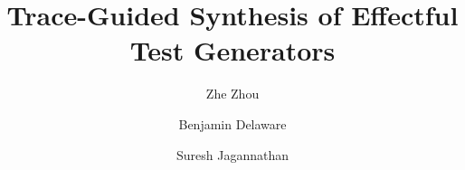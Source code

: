 \documentclass[acmsmall,screen,review,anonymous]{acmart}\settopmatter{printfolios=true,printccs=false,printacmref=false}
\begin{document}
\title{Trace-Guided Synthesis of Effectful Test Generators}
\author{Zhe Zhou}

\author{Benjamin Delaware}

\author{Suresh Jagannathan}






\end{document}
